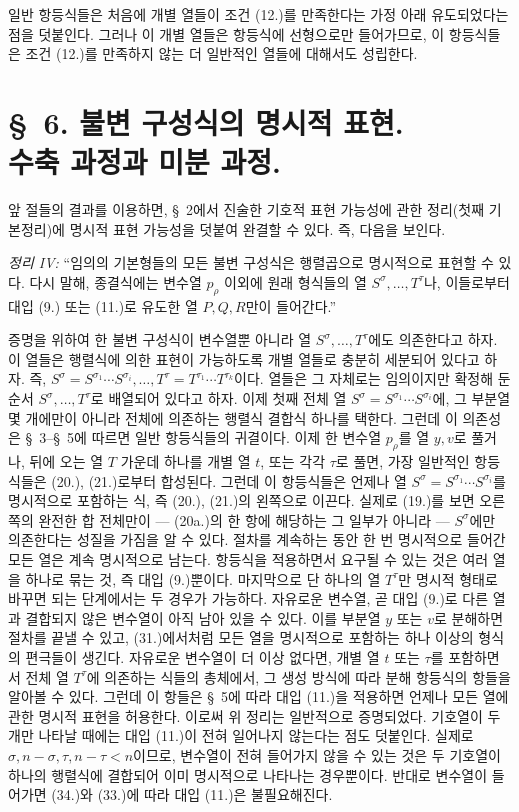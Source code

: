 일반 항등식들은 처음에 개별 열들이 조건 (12.)를 만족한다는 가정 아래 유도되었다는 점을 덧붙인다. 그러나 이 개별 열들은 항등식에 선형으로만 들어가므로, 이 항등식들은 조건 (12.)를 만족하지 않는 더 일반적인 열들에 대해서도 성립한다.

\section*{\S\ 6. 불변 구성식의 명시적 표현.\\수축 과정과 미분 과정.}
앞 절들의 결과를 이용하면, \S\ 2에서 진술한 기호적 표현 가능성에 관한 정리(첫째 기본정리)에 명시적 표현 가능성을 덧붙여 완결할 수 있다. 즉, 다음을 보인다.

\emph{정리 IV:} ``임의의 기본형들의 모든 불변 구성식은 행렬곱으로 명시적으로 표현할 수 있다. 다시 말해, 종결식에는 변수열 $p_\rho$ 이외에 원래 형식들의 열 $S^\sigma,\ldots,T^\tau$나, 이들로부터 대입 (9.) 또는 (11.)로 유도한 열 $P,Q,R$만이 들어간다.''

증명을 위하여 한 불변 구성식이 변수열뿐 아니라 열 $S^\sigma,\ldots,T^\tau$에도 의존한다고 하자. 이 열들은 행렬식에 의한 표현이 가능하도록 개별 열들로 충분히 세분되어 있다고 하자. 즉, $S^\sigma=S^{\sigma_1}\cdots S^{\sigma_i},\ldots,T^\tau=T^{\tau_1}\cdots T^{\tau_k}$이다. 열들은 그 자체로는 임의이지만 확정해 둔 순서 $S^\sigma,\ldots,T^\tau$로 배열되어 있다고 하자. 이제 첫째 전체 열 $S^\sigma=S^{\sigma_1}\cdots S^{\sigma_i}$에, 그 부분열 몇 개에만이 아니라 전체에 의존하는 행렬식 결합식 하나를 택한다. 그런데 이 의존성은 \S\ 3--\S\ 5에 따르면 일반 항등식들의 귀결이다. 이제 한 변수열 $p_\rho$를 열 $y,v$로 풀거나, 뒤에 오는 열 $T$ 가운데 하나를 개별 열 $t$, 또는 각각 $\tau$로 풀면, 가장 일반적인 항등식들은 (20.), (21.)로부터 합성된다. 그런데 이 항등식들은 언제나 열 $S^\sigma=S^{\sigma_1}\cdots S^{\sigma_i}$를 명시적으로 포함하는 식, 즉 (20.), (21.)의 왼쪽으로 이끈다. 실제로 (19.)를 보면 오른쪽의 완전한 합 전체만이 --- (20a.)의 한 항에 해당하는 그 일부가 아니라 --- $S^\sigma$에만 의존한다는 성질을 가짐을 알 수 있다. 절차를 계속하는 동안 한 번 명시적으로 들어간 모든 열은 계속 명시적으로 남는다. 항등식을 적용하면서 요구될 수 있는 것은 여러 열을 하나로 묶는 것, 즉 대입 (9.)뿐이다. 마지막으로 단 하나의 열 $T^\tau$만 명시적 형태로 바꾸면 되는 단계에서는 두 경우가 가능하다. 자유로운 변수열, 곧 대입 (9.)로 다른 열과 결합되지 않은 변수열이 아직 남아 있을 수 있다. 이를 부분열 $y$ 또는 $v$로 분해하면 절차를 끝낼 수 있고, (31.)에서처럼 모든 열을 명시적으로 포함하는 하나 이상의 형식의 편극들이 생긴다. 자유로운 변수열이 더 이상 없다면, 개별 열 $t$ 또는 $\tau$를 포함하면서 전체 열 $T^\tau$에 의존하는 식들의 총체에서, 그 생성 방식에 따라 분해 항등식의 항들을 알아볼 수 있다. 그런데 이 항들은 \S\ 5에 따라 대입 (11.)을 적용하면 언제나 모든 열에 관한 명시적 표현을 허용한다. 이로써 위 정리는 일반적으로 증명되었다. 기호열이 두 개만 나타날 때에는 대입 (11.)이 전혀 일어나지 않는다는 점도 덧붙인다. 실제로 $\sigma,n-\sigma,\tau,n-\tau<n$이므로, 변수열이 전혀 들어가지 않을 수 있는 것은 두 기호열이 하나의 행렬식에 결합되어 이미 명시적으로 나타나는 경우뿐이다. 반대로 변수열이 들어가면 (34.)와 (33.)에 따라 대입 (11.)은 불필요해진다.

